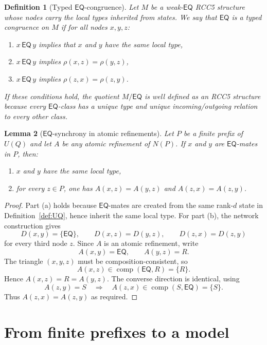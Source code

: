 \documentclass[11pt]{article}
\newtheorem{definition}{Definition}[section]
\newtheorem{lemma}[definition]{Lemma}
\theoremstyle{remark}
\newcommand{\EQ}{\mathsf{EQ}}
\newcommand{\comp}{\operatorname{comp}}
\begin{document}
\begin{definition}[Typed $\EQ$-congruence]\label{def:typed-congruence}
Let $M$ be a weak-$\EQ$ RCC5 structure whose nodes carry the local types inherited from states. We say that $\EQ$ is a \emph{typed congruence} on $M$ if for all nodes $x,y,z$:
\begin{enumerate}[label=(\roman*)]
    \item $x\,\EQ\,y$ implies that $x$ and $y$ have the same local type,
    \item $x\,\EQ\,y$ implies $\rho(x,z)=\rho(y,z)$,
    \item $x\,\EQ\,y$ implies $\rho(z,x)=\rho(z,y)$.
\end{enumerate}
If these conditions hold, the quotient $M/{\EQ}$ is well defined as an RCC5 structure because every $\EQ$-class has a unique type and unique incoming/outgoing relation to every other class.
\end{definition}

\begin{lemma}[$\EQ$-synchrony in atomic refinements]\label{lem:eq-synchrony}
Let $P$ be a finite prefix of $U(Q)$ and let $A$ be any atomic refinement of $N(P)$. If $x$ and $y$ are $\EQ$-mates in $P$, then:
\begin{enumerate}[label=(\alph*)]
    \item $x$ and $y$ have the same local type,
    \item for every $z\in P$, one has $A(x,z)=A(y,z)$ and $A(z,x)=A(z,y)$.
\end{enumerate}
\end{lemma}

\begin{proof}
Part (a) holds because $\EQ$-mates are created from the same rank-$d$ state in Definition~\ref{def:UQ}, hence inherit the same local type. For part (b), the network construction gives
\[
D(x,y)=\{\EQ\},\qquad D(x,z)=D(y,z),\qquad D(z,x)=D(z,y)
\]
for every third node $z$. Since $A$ is an atomic refinement, write
\[
A(x,y)=\EQ,\qquad A(y,z)=R.
\]
The triangle $(x,y,z)$ must be composition-consistent, so
\[
A(x,z)\in \comp(\EQ,R)=\{R\}.
\]
Hence $A(x,z)=R=A(y,z)$. The converse direction is identical, using
\[
A(z,y)=S\quad\Rightarrow\quad A(z,x)\in \comp(S,\EQ)=\{S\}.
\]
Thus $A(z,x)=A(z,y)$ as required.
\end{proof}

\section{From finite prefixes to a model}
\end{document}
